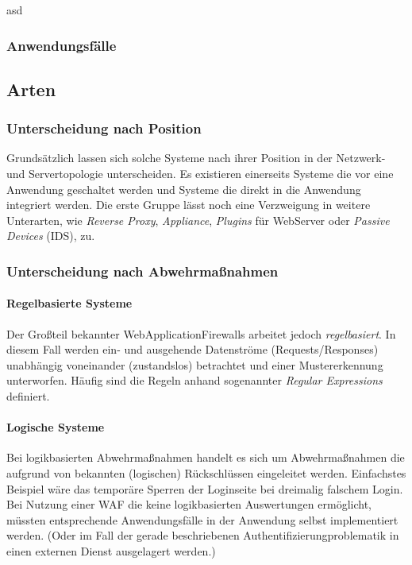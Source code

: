 asd



\subsubsection{Anwendungsfälle}

\subsection{Arten}

\subsubsection{Unterscheidung nach Position}
Grundsätzlich lassen sich solche Systeme nach ihrer Position in der Netzwerk- und Servertopologie unterscheiden. Es existieren einerseits Systeme die vor eine Anwendung geschaltet werden und Systeme die direkt in die Anwendung integriert werden. Die erste Gruppe lässt noch eine Verzweigung in weitere Unterarten, wie \emph{Reverse Proxy}, \emph{Appliance}, \emph{Plugins} für WebServer oder \emph{Passive Devices} (IDS), zu.


\subsubsection{Unterscheidung nach Abwehrmaßnahmen}

\paragraph{Regelbasierte Systeme}
Der Großteil bekannter WebApplicationFirewalls arbeitet jedoch \emph{regelbasiert}. In diesem Fall werden ein- und ausgehende Datenströme (Requests/Responses) unabhängig voneinander (zustandslos) betrachtet und einer Mustererkennung unterworfen. Häufig sind die Regeln anhand sogenannter \emph{Regular Expressions} definiert.

\paragraph{Logische Systeme}
Bei logikbasierten Abwehrmaßnahmen handelt es sich um Abwehrmaßnahmen die aufgrund von bekannten (logischen) Rückschlüssen eingeleitet werden. Einfachstes Beispiel wäre das temporäre Sperren der Loginseite bei dreimalig falschem Login. Bei Nutzung einer WAF die keine logikbasierten Auswertungen ermöglicht, müssten entsprechende Anwendungsfälle in der Anwendung selbst implementiert werden. (Oder im Fall der gerade beschriebenen Authentifizierungproblematik in einen externen Dienst ausgelagert werden.)

